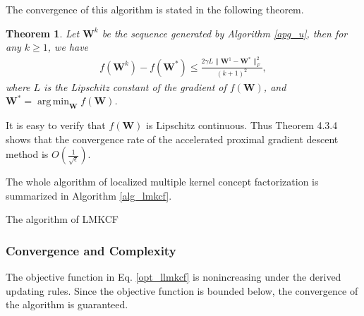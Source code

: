 \documentclass[10pt,journal,compsoc]{IEEEtran}
\newtheorem{theorem}[subsubsection]{Theorem}
\DeclareMathOperator*{\argmin}{arg\,min}
\begin{document}
The convergence of this algorithm is stated in the following theorem.
\begin{theorem}
\cite{} Let ${\mathbf{W}^k}$ be the sequence generated by Algorithm \ref{apg_u}, then for any $k \geq 1$, we have
\begin{align}
f(\mathbf{W}^k)-f(\mathbf{W}^*)\leq \frac{2\gamma L \|\mathbf{W}^1-\mathbf{W}^*\|_F^2}{(k+1)^2},
\end{align}
where $L$ is the Lipschitz constant of the gradient of $f(\mathbf{W})$, and $\mathbf{W}^*=\argmin_\mathbf{W}f(\mathbf{W})$.
\end{theorem}

It is easy to verify that $f(\mathbf{W})$ is Lipschitz continuous. Thus Theorem 4.3.4 shows that the convergence rate of the accelerated proximal gradient
descent method is $O(\frac{1}{\sqrt{\epsilon}})$.

The whole algorithm of localized multiple kernel concept factorization is summarized in Algorithm \ref{alg_lmkcf}.
\begin{algorithm}
    \caption{The algorithm of LMKCF}
  \label{alg_lmkcf}
  \begin{algorithmic}
  \REPEAT
  \end{algorithmic}
\end{algorithm}

\subsubsection{Convergence and Complexity}
The objective function in Eq. \eqref{opt_llmkcf} is nonincreasing under the derived updating rules. Since the objective function is bounded below, the convergence of the algorithm is guaranteed.
\end{document}
